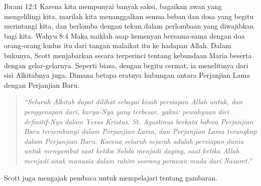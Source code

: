 Ibrani 12:1 Karena kita mempunyai banyak saksi, bagaikan awan yang mengelilingi kita, marilah kita menanggalkan semua beban dan dosa yang begitu merintangi kita, dan berlomba dengan tekun dalam perlombaan yang diwajibkan bagi kita.
Wahyu 8:4 Maka naiklah asap kemenyan bersama-sama dengan doa orang-orang kudus itu dari tangan malaikat itu ke hadapan Allah.
Dalam bukunya, Scott menjabarkan secara terperinci tentang kebundaan Maria beserta dengan gelar-gelarnya. Seperti biasa, dengan begitu cermat, ia menelitinya dari sisi Alkitabnya juga. Dimana betapa eratnya hubungan antara Perjanjian Lama dengan Perjanjian Baru.

\begin{quote}\emph{
“Seluruh Alkitab dapat dilihat sebagai kisah persiapan Allah untuk, dan penggenapan dari, karya-Nya yang terbesar, yakni: pewahyuan diri definitif-Nya dalam Yesus Kristus. St. Agustinus berkata bahwa Perjanjian Baru tersembunyi dalam Perjanjian Lama, dan Perjanjian Lama terungkap dalam Perjanjian Baru. Karena seluruh sejarah adalah persiapan dunia untuk menyambut saat ketika Sabda menjadi daging, saat ketika Allah menjadi anak manusia dalam rahim seorang perawan muda dari Nazaret.”}
\end{quote}

Scott juga mengajak pembaca untuk mempelajari tentang gambaran.

